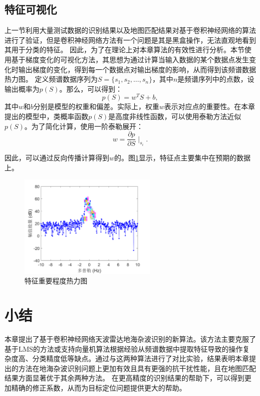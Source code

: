 \subsection{特征可视化}

上一节利用大量测试数据的识别结果以及地图匹配结果对基于卷积神经网络的算法进行了验证，但是卷积神经网络方法有一个问题是其是黑盒操作，无法直观地看到其用于分类的特征。
因此，为了在理论上对本章算法的有效性进行分析。本节使用基于梯度变化的可视化方法，其思想为通过计算当输入数据的某个数据点发生变化时输出梯度的变化，得到每一个数据点对输出梯度的影响，从而得到该频谱数据热力图。
定义频谱数据序列为$ S = \{s_1, s_2, \dots,s_n\} $，其中$n$是频谱序列中的点数，设输出概率为$p(S)$。那么，可以得到：
\begin{equation}
	p(S) = w^TS+b,
	\label{equ:ps}
\end{equation}
其中$ w $和$ b $分别是模型的权重和偏差。实际上，权重$ w $表示对应点的重要性。在本章提出的模型中，类概率函数$p(S)$是高度非线性函数，可以使用泰勒方法近似$p(S)$。为了简化计算，使用一阶泰勒展开：
\begin{equation}
	w = \frac{\partial{p}}{\partial{S}}{\mid}_{s_i}.
	\label{equ:w}
\end{equation}

因此，可以通过反向传播计算得到$ w $的。图\ref{fig:vis}显示，特征点主要集中在预期的数据上。
\begin{figure}[hbt]
	\setlength{\belowcaptionskip}{0pt}
	\centering
	\includegraphics[width=6.67cm]{figures/othr/heatmap}
	\caption{特征重要程度热力图}
	\label{fig:vis}
\end{figure}

\section{小结}
\label{sec:othr_summary}
本章提出了基于卷积神经网络天波雷达地海杂波识别的新算法。该方法主要克服了基于LMS的方法或支持向量机算法根据经验从频谱数据中提取特征导致的操作复杂度高、分类精度低等缺点。通过与这两种算法进行了对比实验，结果表明本章提出的方法在地海杂波识别问题上更加有效且具有更强的抗干扰性能，且在地图匹配结果方面显著优于其余两种方法。
在更高精度的识别结果的帮助下，可以得到更加精确的修正系数，从而为目标定位问题提供更大的帮助。
